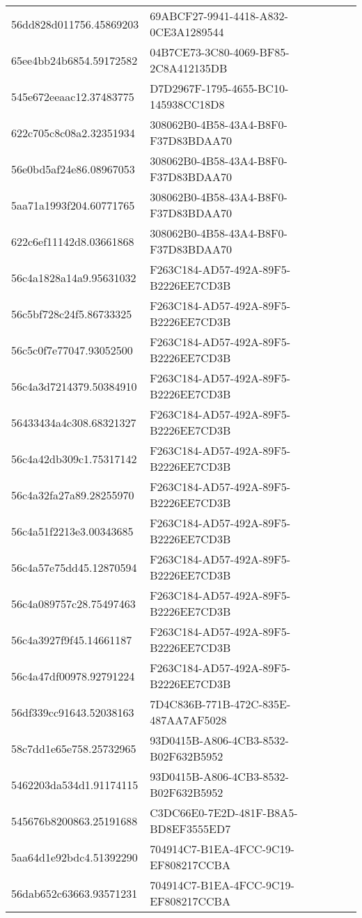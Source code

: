 \begin{tabular}{ll}
56dd828d011756.45869203 & 69ABCF27-9941-4418-A832-0CE3A1289544 \\
65ee4bb24b6854.59172582 & 04B7CE73-3C80-4069-BF85-2C8A412135DB \\
545e672eeaac12.37483775 & D7D2967F-1795-4655-BC10-145938CC18D8 \\
622c705c8c08a2.32351934 & 308062B0-4B58-43A4-B8F0-F37D83BDAA70 \\
56e0bd5af24e86.08967053 & 308062B0-4B58-43A4-B8F0-F37D83BDAA70 \\
5aa71a1993f204.60771765 & 308062B0-4B58-43A4-B8F0-F37D83BDAA70 \\
622c6ef11142d8.03661868 & 308062B0-4B58-43A4-B8F0-F37D83BDAA70 \\
56c4a1828a14a9.95631032 & F263C184-AD57-492A-89F5-B2226EE7CD3B \\
56c5bf728c24f5.86733325 & F263C184-AD57-492A-89F5-B2226EE7CD3B \\
56c5c0f7e77047.93052500 & F263C184-AD57-492A-89F5-B2226EE7CD3B \\
56c4a3d7214379.50384910 & F263C184-AD57-492A-89F5-B2226EE7CD3B \\
56433434a4c308.68321327 & F263C184-AD57-492A-89F5-B2226EE7CD3B \\
56c4a42db309c1.75317142 & F263C184-AD57-492A-89F5-B2226EE7CD3B \\
56c4a32fa27a89.28255970 & F263C184-AD57-492A-89F5-B2226EE7CD3B \\
56c4a51f2213e3.00343685 & F263C184-AD57-492A-89F5-B2226EE7CD3B \\
56c4a57e75dd45.12870594 & F263C184-AD57-492A-89F5-B2226EE7CD3B \\
56c4a089757c28.75497463 & F263C184-AD57-492A-89F5-B2226EE7CD3B \\
56c4a3927f9f45.14661187 & F263C184-AD57-492A-89F5-B2226EE7CD3B \\
56c4a47df00978.92791224 & F263C184-AD57-492A-89F5-B2226EE7CD3B \\
56df339cc91643.52038163 & 7D4C836B-771B-472C-835E-487AA7AF5028 \\
58c7dd1e65e758.25732965 & 93D0415B-A806-4CB3-8532-B02F632B5952 \\
5462203da534d1.91174115 & 93D0415B-A806-4CB3-8532-B02F632B5952 \\
545676b8200863.25191688 & C3DC66E0-7E2D-481F-B8A5-BD8EF3555ED7 \\
5aa64d1e92bdc4.51392290 & 704914C7-B1EA-4FCC-9C19-EF808217CCBA \\
56dab652c63663.93571231 & 704914C7-B1EA-4FCC-9C19-EF808217CCBA \\

\end{tabular}
